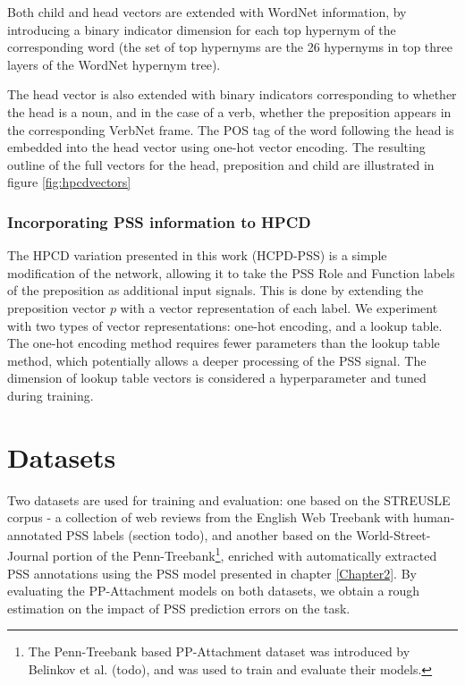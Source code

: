 Both child and head vectors are extended with WordNet information, by introducing a binary indicator dimension for each top hypernym of the corresponding word (the set of top hypernyms are the 26 hypernyms in top three layers of the WordNet hypernym tree). 

The head vector is also extended with binary indicators corresponding to whether the head is a noun, and in the case of a verb, whether the preposition appears in the corresponding VerbNet frame. The POS tag of the word following the head is embedded into the head vector using one-hot vector encoding. The resulting outline of the full vectors for the head, preposition and child are illustrated in figure \ref{fig:hpcdvectors}

\subsubsection{Incorporating PSS information to HPCD}

The HPCD variation presented in this work (HCPD-PSS) is a simple modification of the network, allowing it to take the PSS Role and Function labels of the preposition as additional input signals. This is done by extending the preposition vector $p$ with a vector representation of each label. We experiment with two types of vector representations: one-hot encoding, and a lookup table. The one-hot encoding method requires fewer parameters than the lookup table method, which potentially allows a deeper processing of the PSS signal. The dimension of lookup table vectors is considered a hyperparameter and tuned during training.

\section{Datasets}

Two datasets are used for training and evaluation: one based on the STREUSLE corpus - a collection of web reviews from the English Web Treebank with human-annotated PSS labels (section todo), and another based on the World-Street-Journal portion of the Penn-Treebank\footnote{The Penn-Treebank based PP-Attachment dataset was introduced by Belinkov et al. (todo), and was used to train and evaluate their models.}, enriched with automatically extracted PSS annotations using the PSS model presented in chapter \ref{Chapter2}. By evaluating the PP-Attachment models on both datasets, we obtain a rough estimation on the impact of PSS prediction errors on the task.

